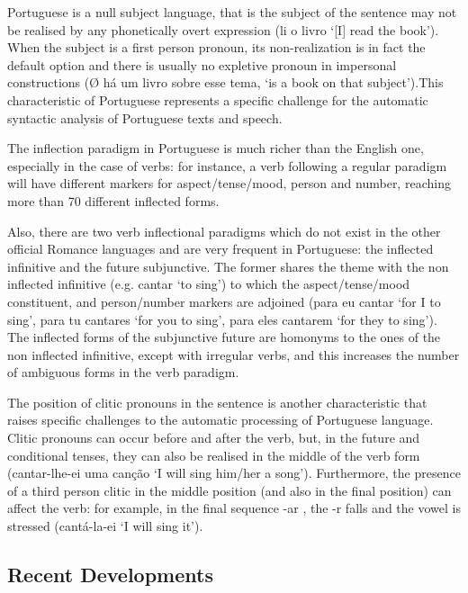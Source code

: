 \documentclass[]{../metanetpaper}
\begin{document}
\begin{multicols}{2}
Portuguese is a null subject language, that is the subject of the sentence may not be realised by any phonetically overt expression (li o livro ‘[I] read the book’). When the subject is a first person pronoun, its non-realization is in fact the default option and there is usually no expletive pronoun in impersonal constructions (Ø há um livro sobre esse tema, ‘is a book on that subject’).This characteristic of Portuguese represents a specific challenge for the automatic syntactic analysis of Portuguese texts and speech.

The inflection paradigm in Portuguese is much richer than the English one, especially in the case of verbs: for instance, a verb following a regular paradigm will have different markers for aspect/tense/mood, person and number, reaching more than 70 different inflected forms.


Also, there are two verb inflectional paradigms which do not exist in the other official Romance languages and are very frequent in Portuguese: the inflected infinitive and the future subjunctive.  The former shares the theme with the non inflected infinitive (e.g. cantar ‘to sing’) to which the aspect/tense/mood constituent, and person/number markers are adjoined (para eu cantar ‘for I to sing’, para tu cantares ‘for you to sing’, para eles cantarem ‘for they to sing’). The inflected forms of the subjunctive future are homonyms to the ones of the non inflected infinitive, except with irregular verbs, and this increases the number of ambiguous forms in the verb paradigm.

The position of clitic pronouns in the sentence is another characteristic that raises specific challenges to the automatic processing of Portuguese language. Clitic pronouns can occur before and after the verb, but, in the future and conditional tenses, they can also be realised in the middle of the verb form (cantar-lhe-ei uma canção ‘I will sing him/her a song’). Furthermore, the presence of a third person clitic in the middle position (and also in the final position) can affect the verb: for example, in the final sequence -ar , the -r falls and the vowel is stressed (cantá-la-ei ‘I will sing it’).

\subsection{Recent Developments}


\end{multicols}
\end{document}
